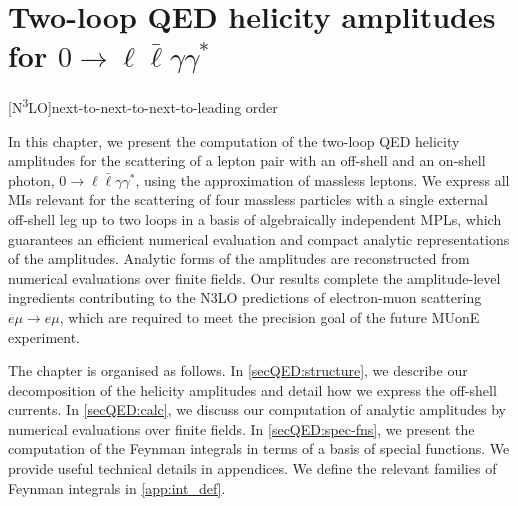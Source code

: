 \documentclass[main.tex]{subfiles}
\begin{document}
\chapter{Two-loop QED helicity amplitudes for $0\to\ell \bar\ell \gamma \gamma^*$} \label{sec:QEDpaper}
\begin{acronym}
    [N\textsuperscript{3}LO]{next-to-next-to-next-to-leading order}
\end{acronym}

In this chapter, we present the computation of the two-loop QED helicity amplitudes for the scattering of a
lepton pair with an off-shell and an on-shell photon, $0\to\ell \bar\ell \gamma \gamma^*$, using the approximation of massless leptons. We express all MIs relevant for the scattering of four massless particles with a single external off-shell leg up to two loops in a basis of algebraically independent \aclp{MPL}, which guarantees an efficient numerical evaluation and compact analytic representations of the amplitudes. Analytic forms of the amplitudes are reconstructed from numerical evaluations over finite fields. Our results complete the amplitude-level ingredients contributing to the \acs{N3LO} predictions of electron-muon scattering $e\mu\to e\mu$, which are required to meet the precision goal of the future MUonE experiment.

The chapter is organised as follows. In \cref{secQED:structure}, we describe our decomposition of the helicity amplitudes and detail how we express the off-shell currents. In \cref{secQED:calc}, we discuss our computation of analytic amplitudes by numerical evaluations over finite fields. In \cref{secQED:spec-fns}, we present the computation of the Feynman integrals in terms of a basis of special functions. We provide useful technical details in appendices. We define the relevant families of Feynman integrals in \cref{app:int_def}.
\end{document}
